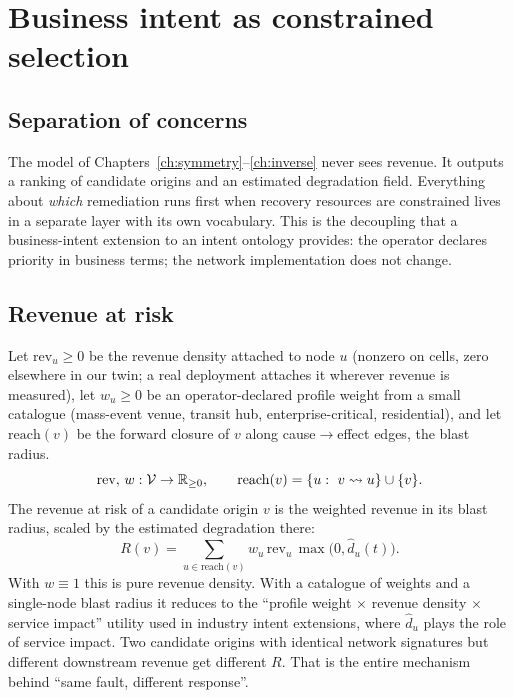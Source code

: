 \chapter{Business intent as constrained selection}
\label{ch:intent}

\section{Separation of concerns}
The model of Chapters~\ref{ch:symmetry}--\ref{ch:inverse} never sees revenue. It outputs a
ranking of candidate origins and an estimated degradation field. Everything about \emph{which}
remediation runs first when recovery resources are constrained lives in a separate layer with its
own vocabulary. This is the decoupling that a business-intent extension to an intent ontology
provides: the operator declares priority in business terms; the network implementation does not
change.

\section{Revenue at risk}
Let $\mathrm{rev}_u\ge0$ be the revenue density attached to node $u$ (nonzero on cells, zero
elsewhere in our twin; a real deployment attaches it wherever revenue is measured), let
$w_u\ge0$ be an operator-declared profile weight from a small catalogue (mass-event venue, transit
hub, enterprise-critical, residential), and let $\mathrm{reach}(v)$ be the forward closure of $v$
along cause$\to$effect edges, the blast radius.
\begin{equation}
\mathrm{rev},\,w:\mathcal{V}\to\mathbb{R}_{\ge0},\qquad \mathrm{reach}(v)=\{u:\ v\leadsto u\}\cup\{v\}.
\label{eq:revenue}
\end{equation}
The revenue at risk of a candidate origin $v$ is the weighted revenue in its blast radius, scaled by
the estimated degradation there:
\begin{equation}
R(v)=\sum_{u\in\mathrm{reach}(v)}w_u\,\mathrm{rev}_u\,\max\big(0,\hat d_u(t)\big).
\label{eq:rar}
\end{equation}
With $w\equiv1$ this is pure revenue density. With a catalogue of weights and a single-node blast
radius it reduces to the ``profile weight $\times$ revenue density $\times$ service impact''
utility used in industry intent extensions, where $\hat d_u$ plays the role of service impact.
Two candidate origins with identical network signatures but different downstream revenue get
different $R$. That is the entire mechanism behind ``same fault, different response''.

